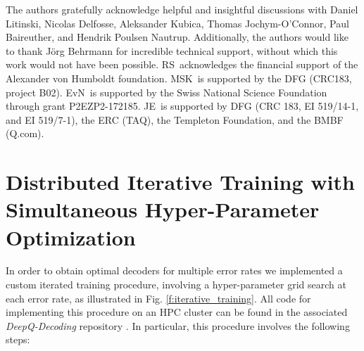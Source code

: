\documentclass[twocolumn,preprintnumbers,amsmath,amssymb,notitlepage,nofootinbib,longbibliography,superscriptaddress,aps,pra,10pt]{revtex4-1}
\begin{document}
	\begin{acknowledgments}
		The authors gratefully acknowledge helpful and insightful discussions with Daniel Litinski, Nicolas Delfosse, Aleksander Kubica, Thomas Jochym-O'Connor, Paul Baireuther, and Hendrik Poulsen Nautrup.
		Additionally, the authors would like to thank J\"{o}rg Behrmann for incredible technical support, without which this work would not have been possible.
		RS\ acknowledges the financial support of the Alexander von Humboldt foundation.
		MSK\ is supported by the DFG (CRC183, project B02).
		EvN\ is supported by the Swiss National Science Foundation through grant P2EZP2-172185.
		JE\ is supported by DFG (CRC 183, EI 519/14-1, and EI 519/7-1), the ERC (TAQ), the Templeton Foundation, and the BMBF (Q.com).
	\end{acknowledgments}

\appendix

\section{Distributed Iterative Training with Simultaneous Hyper-Parameter Optimization}\label{A:training}

	In order to obtain optimal decoders for multiple error rates we implemented a custom iterated training procedure, involving a hyper-parameter grid search at each error rate, as illustrated in Fig. \ref{f:iterative_training}. All code for implementing this procedure on an HPC cluster can be found in the associated \emph{DeepQ-Decoding} repository \cite{DeepQDecoding}. In particular, this procedure involves the following steps:
\end{document}
